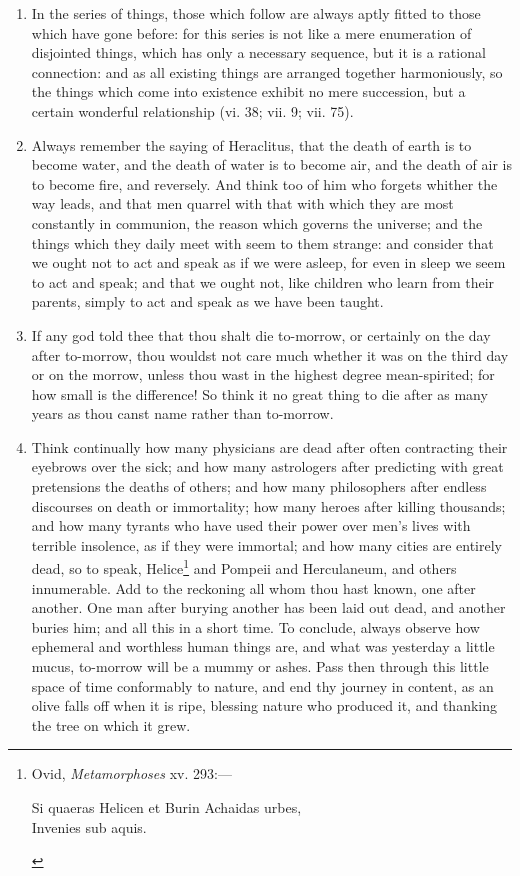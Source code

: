 \begin{enumerate}
\item In the series of things, those which follow are always aptly fitted to those which have gone before: for this series is not like a mere enumeration of disjointed things, which has only a necessary sequence, but it is a rational connection: and as all existing things are arranged together harmoniously, so the things which come into existence exhibit no mere succession, but a certain wonderful relationship (vi. 38; vii. 9; vii. 75).

\item Always remember the saying of Heraclitus, that the death of earth is to become water, and the death of water is to become air, and the death of air is to become fire, and reversely. And think too of him who forgets whither the way leads, and that men quarrel with that with which they are most constantly in communion, the reason which governs the universe; and the things which they daily meet with seem to them strange: and consider that we ought not to act and speak as if we were asleep, for even in sleep we seem to act and speak; and that we ought not, like children who learn from their parents, simply to act and speak as we have been taught.

\item If any god told thee that thou shalt die to-morrow, or certainly on the day after to-morrow, thou wouldst not care much whether it was on the third day or on the morrow, unless thou wast in the highest degree mean-spirited; for how small is the difference! So think it no great thing to die after as many years as thou canst name rather than to-morrow.

\item Think continually how many physicians are dead after often contracting their eyebrows over the sick; and how many astrologers after predicting with great pretensions the deaths of others; and how many philosophers after endless discourses on death or immortality; how many heroes after killing thousands; and how many tyrants who have used their power over men's lives with terrible insolence, as if they were immortal; and how many cities are entirely dead, so to speak, Helice\footnote{Ovid, \textit{Metamorphoses} xv. 293:—
	\begin{displayquote}
		Si quaeras Helicen et Burin Achaidas urbes,	\\
		Invenies sub aquis.
	\end{displayquote}} and Pompeii and Herculaneum, and others innumerable. Add to the reckoning all whom thou hast known, one after another. One man after burying another has been laid out dead, and another buries him; and all this in a short time. To conclude, always observe how ephemeral and worthless human things are, and what was yesterday a little mucus, to-morrow will be a mummy or ashes. Pass then through this little space of time conformably to nature, and end thy journey in content, as an olive falls off when it is ripe, blessing nature who produced it, and thanking the tree on which it grew.


\end{enumerate}
